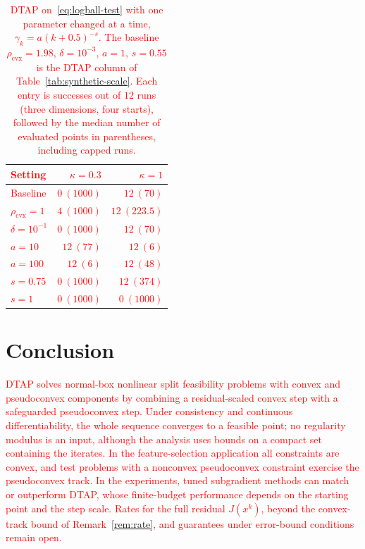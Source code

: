 \documentclass[]{interact}
\theoremstyle{plain}
\theoremstyle{definition}
\theoremstyle{remark}
\newcommand{\cvx}{\mathrm{cvx}}
\begin{document}
\begin{table}[t]
\centering\small
\setlength{\tabcolsep}{5pt}
\caption{\textcolor{red}{DTAP on~\eqref{eq:logball-test} with one parameter changed at a time,
$\gamma_k=a(k+0.5)^{-s}$. The baseline $\rho_{\cvx}=1.98$, $\delta=10^{-3}$, $a=1$,
$s=0.55$ is the DTAP column of Table~\ref{tab:synthetic-scale}. Each entry is
successes out of $12$ runs (three dimensions, four starts), followed by the
median number of evaluated points in parentheses, including capped runs.}}
\label{tab:dtap-sweep}
\begin{tabular}{@{}lrr@{}}
\toprule
\leavevmode\textcolor{red}{Setting} & \leavevmode\textcolor{red}{$\kappa=0.3$} & \leavevmode\textcolor{red}{$\kappa=1$}\\
\midrule
\leavevmode\textcolor{red}{Baseline} & \leavevmode\textcolor{red}{$0\ (1000)$} & \leavevmode\textcolor{red}{$12\ (70)$}\\
\leavevmode\textcolor{red}{$\rho_{\cvx}=1$} & \leavevmode\textcolor{red}{$4\ (1000)$} & \leavevmode\textcolor{red}{$12\ (223.5)$}\\
\leavevmode\textcolor{red}{$\delta=10^{-1}$} & \leavevmode\textcolor{red}{$0\ (1000)$} & \leavevmode\textcolor{red}{$12\ (70)$}\\
\leavevmode\textcolor{red}{$a=10$} & \leavevmode\textcolor{red}{$12\ (77)$} & \leavevmode\textcolor{red}{$12\ (6)$}\\
\leavevmode\textcolor{red}{$a=100$} & \leavevmode\textcolor{red}{$12\ (6)$} & \leavevmode\textcolor{red}{$12\ (48)$}\\
\leavevmode\textcolor{red}{$s=0.75$} & \leavevmode\textcolor{red}{$0\ (1000)$} & \leavevmode\textcolor{red}{$12\ (374)$}\\
\leavevmode\textcolor{red}{$s=1$} & \leavevmode\textcolor{red}{$0\ (1000)$} & \leavevmode\textcolor{red}{$0\ (1000)$}\\
\bottomrule
\end{tabular}
\end{table}

\section{Conclusion}\label{sec:conclusion}
\leavevmode\textcolor{red}{DTAP solves normal-box nonlinear split feasibility problems with convex and pseudoconvex components by combining a residual-scaled convex step with a safeguarded pseudoconvex step. Under consistency and continuous differentiability, the whole sequence converges to a feasible point; no regularity modulus is an input, although the analysis uses bounds on a compact set containing the iterates. In the feature-selection application all constraints are convex, and test problems with a nonconvex pseudoconvex constraint exercise the pseudoconvex track. In the experiments, tuned subgradient methods can match or outperform DTAP, whose finite-budget performance depends on the starting point and the step scale. Rates for the full residual $J(x^k)$, beyond the convex-track bound of Remark~\ref{rem:rate}, and guarantees under error-bound conditions remain open.}
\end{document}
